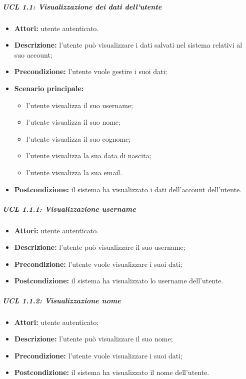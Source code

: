 \subparagraph{UCL 1.1: Visualizzazione dei dati dell'utente}
\begin{itemize}
	\item \textbf{Attori:} utente autenticato.
	\item \textbf{Descrizione:} l'utente può visualizzare i dati salvati nel sistema relativi al suo account;
	\item \textbf{Precondizione:} l'utente vuole gestire i suoi dati;
	\item \textbf{Scenario principale:}
	\begin{itemize}
		\item l'utente visualizza il suo username;
		\item l'utente visualizza il suo nome;
		\item l'utente visualizza il suo cognome;
		\item l'utente visualizza la sua data di nascita;
		\item l'utente visualizza la sua email.
	\end{itemize}
	\item \textbf{Postcondizione:} il sistema ha visualizzato i dati dell'account dell'utente.
\end{itemize}

\subparagraph{UCL 1.1.1: Visualizzazione username}
\begin{itemize}
	\item \textbf{Attori:} utente autenticato.
	\item \textbf{Descrizione:} l'utente può visualizzare il suo username;
	\item \textbf{Precondizione:} l'utente vuole visualizzare i suoi dati;
\item \textbf{Postcondizione:} il sistema ha visualizzato lo username dell'utente.
\end{itemize}

\subparagraph{UCL 1.1.2: Visualizzazione nome}
\begin{itemize}
	\item \textbf{Attori:} utente autenticato;
	\item \textbf{Descrizione:} l'utente può visualizzare il suo nome;
	\item \textbf{Precondizione:} l'utente vuole visualizzare i suoi dati;
	\item \textbf{Postcondizione:} il sistema ha visualizzato il nome dell'utente.
\end{itemize}

